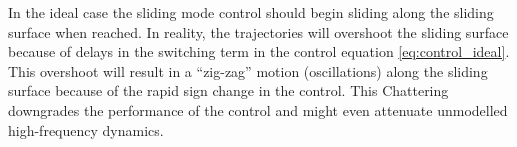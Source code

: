 In the ideal case the sliding mode control should begin sliding along the sliding surface when reached. In reality, the trajectories will overshoot the sliding surface because of delays in the switching term in the control equation \ref{eq:control_ideal}. This overshoot will result in a ``zig-zag'' motion (oscillations) along the sliding surface because of the rapid sign change in the control. This Chattering downgrades the performance of the control and might even attenuate unmodelled high-frequency dynamics.

